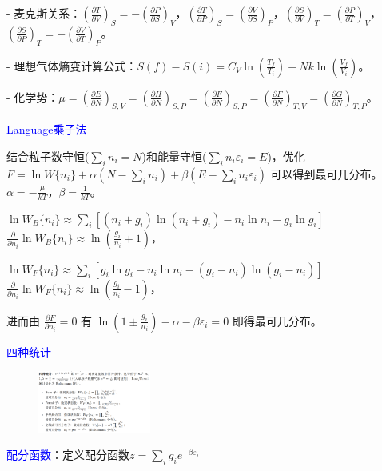\documentclass[a4paper,8pt]{extarticle} %
\newcommand{\bluetext}[1]{\textcolor{blue}{#1}}
\begin{document}
\begin{multicols}{3}
- 麦克斯关系：$\left(\frac{\partial T}{\partial V}\right)_S = -\left(\frac{\partial P}{\partial S}\right)_V$，$\left(\frac{\partial T}{\partial P}\right)_S = \left(\frac{\partial V}{\partial S}\right)_P$，$\left(\frac{\partial S}{\partial V}\right)_T = \left(\frac{\partial P}{\partial T}\right)_V$，$\left(\frac{\partial S}{\partial P}\right)_T = -\left(\frac{\partial V}{\partial T}\right)_P$。

- 理想气体熵变计算公式：$S(f) - S(i) = C_V \ln\left(\frac{T_f}{T_i}\right) + Nk\ln\left(\frac{V_f}{V_i}\right)$。

- 化学势：$\mu = \left(\frac{\partial E}{\partial N}\right)_{S,V} = \left(\frac{\partial H}{\partial N}\right)_{S,P} = \left(\frac{\partial F}{\partial N}\right)_{S,P} = \left(\frac{\partial F}{\partial N}\right)_{T,V} = \left(\frac{\partial G}{\partial N}\right)_{T,P}$。

\bluetext{Language乘子法}

结合粒子数守恒($\sum_i n_i = N$)和能量守恒($\sum_i n_i\varepsilon_i = E$)，优化 $F = \ln W\{n_i\} + \alpha(N-\sum_i n_i) + \beta(E-\sum_i n_i\varepsilon_i)$ 可以得到最可几分布。$\alpha = -\frac{\mu}{kT}$，$\beta = \frac{1}{kT}$。

$\ln W_B\{n_i\} \approx \sum_i [(n_i + g_i)\ln(n_i + g_i) - n_i \ln n_i - g_i \ln g_i]$
$\frac{\partial}{\partial n_i}\ln W_B\{n_i\} \approx \ln(\frac{g_i}{n_i} + 1)$，

$\ln W_F\{n_i\} \approx \sum_i [g_i \ln g_i - n_i \ln n_i - (g_i - n_i)\ln(g_i - n_i)]$
$\frac{\partial}{\partial n_i}\ln W_F\{n_i\} \approx \ln(\frac{g_i}{n_i} - 1)$，

进而由 $\frac{\partial F}{\partial n_i} = 0$ 有 $\ln(1 \pm \frac{g_i}{n_i}) - \alpha - \beta\varepsilon_i = 0$ 即得最可几分布。

\bluetext{四种统计}

\begin{figure}[H]
    \vspace{-0.3cm}
    \centering
    \includegraphics[width=0.33\textwidth]{images/1.png}
    \vspace{-0.6cm}
\end{figure}

\bluetext{配分函数}：定义配分函数$z=\sum_i g_i e^{-\beta\varepsilon_i}$


\end{multicols}
\end{document}
